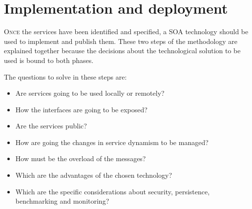 









\section{Implementation and deployment}
\label{subsec:soaea:implementation}
\lettrine{O}{nce} the services have been identified and specified, a SOA technology should be used to implement and publish them. These two steps of the methodology are explained together because the decisions about the technological solution to be used is bound to both phases.

The questions to solve in these steps are:
\begin{itemize}
\item Are services going to be used locally or remotely?
\item How the interfaces are going to be exposed?
\item Are the services public?
\item How are going the changes in service dynamism to be managed?
\item How must be the overload of the messages? 
\item Which are the advantages of the chosen technology?
\item Which are the specific considerations about security, persistence, benchmarking and monitoring?
\end{itemize} 

